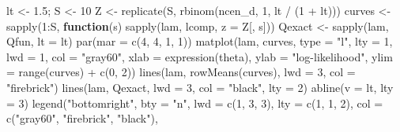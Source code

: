 \documentclass[
  letterpaper,
  DIV=11,
  numbers=noendperiod]{scrreprt}
\newenvironment{Shaded}{\begin{snugshade}}{\end{snugshade}}
\newcommand{\AttributeTok}[1]{\textcolor[rgb]{0.40,0.45,0.13}{#1}}
\newcommand{\ControlFlowTok}[1]{\textcolor[rgb]{0.00,0.23,0.31}{\textbf{#1}}}
\newcommand{\DecValTok}[1]{\textcolor[rgb]{0.68,0.00,0.00}{#1}}
\newcommand{\FloatTok}[1]{\textcolor[rgb]{0.68,0.00,0.00}{#1}}
\newcommand{\FunctionTok}[1]{\textcolor[rgb]{0.28,0.35,0.67}{#1}}
\newcommand{\NormalTok}[1]{\textcolor[rgb]{0.00,0.23,0.31}{#1}}
\newcommand{\OtherTok}[1]{\textcolor[rgb]{0.00,0.23,0.31}{#1}}
\newcommand{\SpecialCharTok}[1]{\textcolor[rgb]{0.37,0.37,0.37}{#1}}
\newcommand{\StringTok}[1]{\textcolor[rgb]{0.13,0.47,0.30}{#1}}
\begin{document}
\begin{Shaded}
\begin{Highlighting}[]
\NormalTok{lt }\OtherTok{\textless{}{-}} \FloatTok{1.5}\NormalTok{; S }\OtherTok{\textless{}{-}} \DecValTok{10}
\NormalTok{Z }\OtherTok{\textless{}{-}} \FunctionTok{replicate}\NormalTok{(S, }\FunctionTok{rbinom}\NormalTok{(ncen\_d, }\DecValTok{1}\NormalTok{, lt }\SpecialCharTok{/}\NormalTok{ (}\DecValTok{1} \SpecialCharTok{+}\NormalTok{ lt)))}
\NormalTok{curves }\OtherTok{\textless{}{-}} \FunctionTok{sapply}\NormalTok{(}\DecValTok{1}\SpecialCharTok{:}\NormalTok{S, }\ControlFlowTok{function}\NormalTok{(s) }\FunctionTok{sapply}\NormalTok{(lam, lcomp, }\AttributeTok{z =}\NormalTok{ Z[, s]))}
\NormalTok{Qexact }\OtherTok{\textless{}{-}} \FunctionTok{sapply}\NormalTok{(lam, Qfun, }\AttributeTok{lt =}\NormalTok{ lt)}
\FunctionTok{par}\NormalTok{(}\AttributeTok{mar =} \FunctionTok{c}\NormalTok{(}\DecValTok{4}\NormalTok{, }\DecValTok{4}\NormalTok{, }\DecValTok{1}\NormalTok{, }\DecValTok{1}\NormalTok{))}
\FunctionTok{matplot}\NormalTok{(lam, curves, }\AttributeTok{type =} \StringTok{"l"}\NormalTok{, }\AttributeTok{lty =} \DecValTok{1}\NormalTok{, }\AttributeTok{lwd =} \DecValTok{1}\NormalTok{, }\AttributeTok{col =} \StringTok{"gray60"}\NormalTok{,}
        \AttributeTok{xlab =} \FunctionTok{expression}\NormalTok{(theta), }\AttributeTok{ylab =} \StringTok{"log{-}likelihood"}\NormalTok{,}
        \AttributeTok{ylim =} \FunctionTok{range}\NormalTok{(curves) }\SpecialCharTok{+} \FunctionTok{c}\NormalTok{(}\DecValTok{0}\NormalTok{, }\DecValTok{2}\NormalTok{))}
\FunctionTok{lines}\NormalTok{(lam, }\FunctionTok{rowMeans}\NormalTok{(curves), }\AttributeTok{lwd =} \DecValTok{3}\NormalTok{, }\AttributeTok{col =} \StringTok{"firebrick"}\NormalTok{)}
\FunctionTok{lines}\NormalTok{(lam, Qexact, }\AttributeTok{lwd =} \DecValTok{3}\NormalTok{, }\AttributeTok{col =} \StringTok{"black"}\NormalTok{, }\AttributeTok{lty =} \DecValTok{2}\NormalTok{)}
\FunctionTok{abline}\NormalTok{(}\AttributeTok{v =}\NormalTok{ lt, }\AttributeTok{lty =} \DecValTok{3}\NormalTok{)}
\FunctionTok{legend}\NormalTok{(}\StringTok{"bottomright"}\NormalTok{, }\AttributeTok{bty =} \StringTok{"n"}\NormalTok{, }\AttributeTok{lwd =} \FunctionTok{c}\NormalTok{(}\DecValTok{1}\NormalTok{, }\DecValTok{3}\NormalTok{, }\DecValTok{3}\NormalTok{), }\AttributeTok{lty =} \FunctionTok{c}\NormalTok{(}\DecValTok{1}\NormalTok{, }\DecValTok{1}\NormalTok{, }\DecValTok{2}\NormalTok{),}
       \AttributeTok{col =} \FunctionTok{c}\NormalTok{(}\StringTok{"gray60"}\NormalTok{, }\StringTok{"firebrick"}\NormalTok{, }\StringTok{"black"}\NormalTok{),}

\end{Highlighting}
\end{Shaded}
\end{document}
